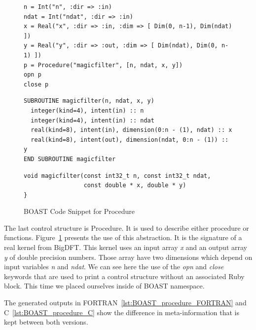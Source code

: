 \documentclass[review]{elsarticle}
\begin{document}
\begin{figure}
\begin{lstlisting}
n = Int("n", :dir => :in)
ndat = Int("ndat", :dir => :in)
x = Real("x", :dir => :in, :dim => [ Dim(0, n-1), Dim(ndat) ])
y = Real("y", :dir => :out, :dim => [ Dim(ndat), Dim(0, n-1) ])
p = Procedure("magicfilter", [n, ndat, x, y])
opn p
close p
\end{lstlisting}


\begin{lstlisting}
SUBROUTINE magicfilter(n, ndat, x, y)
  integer(kind=4), intent(in) :: n
  integer(kind=4), intent(in) :: ndat
  real(kind=8), intent(in), dimension(0:n - (1), ndat) :: x
  real(kind=8), intent(out), dimension(ndat, 0:n - (1)) :: y
END SUBROUTINE magicfilter
\end{lstlisting}

\begin{lstlisting}
void magicfilter(const int32_t n, const int32_t ndat,
                 const double * x, double * y)
}
\end{lstlisting}
\caption{BOAST Code Snippet for Procedure}
\label{fig:BOAST_procedure}
\end{figure}

The last control structure is Procedure. It is used to describe either procedure
or functions. Figure~\ref{fig:BOAST_procedure} presents the use of this
abstraction. It is the signature of a real kernel from BigDFT. This kernel uses
an input array \emph{x} and an output array \emph{y} of double precision
numbers. Those array have two dimensions which depend on input variables
\emph{n} and \emph{ndat}. We can see here the use of the \emph{opn} and
\emph{close} keywords that are used to print a control structure without an
associated Ruby block. This time we placed ourselves inside of BOAST namespace.

The generated outputs in FORTRAN~\ref{lst:BOAST_procedure_FORTRAN} and
C~\ref{lst:BOAST_procedure_C} show the difference in meta-information that is
kept between both versions.
  
\end{document}
